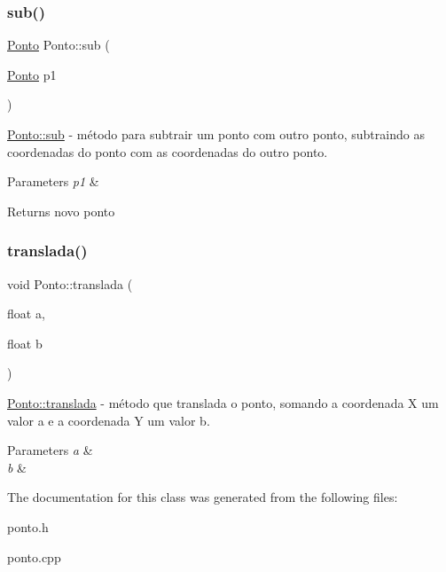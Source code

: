 \subsubsection{\texorpdfstring{sub()}{sub()}}
{\footnotesize\ttfamily \hyperlink{classPonto}{Ponto} Ponto\+::sub (\begin{DoxyParamCaption}\item[{\hyperlink{classPonto}{Ponto}}]{p1 }\end{DoxyParamCaption})}



\hyperlink{classPonto_a8404fcad0fca2ce768ab9e1550f5d3a0}{Ponto\+::sub} -\/ método para \textquotesingle{}subtrair\textquotesingle{} um ponto com outro ponto, subtraindo as coordenadas do ponto com as coordenadas do outro ponto. 


\begin{DoxyParams}{Parameters}
{\em p1} & \\
\hline
\end{DoxyParams}
\begin{DoxyReturn}{Returns}
novo ponto 
\end{DoxyReturn}
\mbox{\label{classPonto_a96a4395204ec010814e67d20705e630f}} 
\subsubsection{\texorpdfstring{translada()}{translada()}}
{\footnotesize\ttfamily void Ponto\+::translada (\begin{DoxyParamCaption}\item[{float}]{a,  }\item[{float}]{b }\end{DoxyParamCaption})}



\hyperlink{classPonto_a96a4395204ec010814e67d20705e630f}{Ponto\+::translada} -\/ método que translada o ponto, somando a coordenada X um valor a e a coordenada Y um valor b. 


\begin{DoxyParams}{Parameters}
{\em a} & \\
\hline
{\em b} & \\
\hline
\end{DoxyParams}


The documentation for this class was generated from the following files\+:\begin{DoxyCompactItemize}
\item 
ponto.\+h\item 
ponto.\+cpp\end{DoxyCompactItemize}
